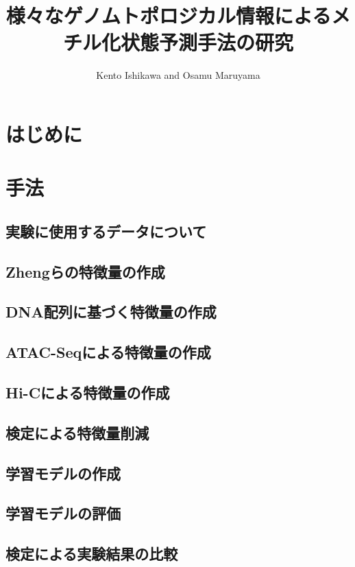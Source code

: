\documentclass{article}
\begin{document}
    \title{様々なゲノムトポロジカル情報によるメチル化状態予測手法の研究}
    \author{Kento Ishikawa and Osamu Maruyama}
    \maketitle
    \newpage

    \begin{abstract}
    \end{abstract}

    \section{はじめに}
    \newpage

    \section{手法}

    \subsection{実験に使用するデータについて}

    \subsection{Zhengらの特徴量の作成}

    \subsection{DNA配列に基づく特徴量の作成}

    \subsection{ATAC-Seqによる特徴量の作成}

    \subsection{Hi-Cによる特徴量の作成}

    \subsection{検定による特徴量削減}

    \subsection{学習モデルの作成}

    \subsection{学習モデルの評価}

    \subsection{検定による実験結果の比較}
\end{document}

